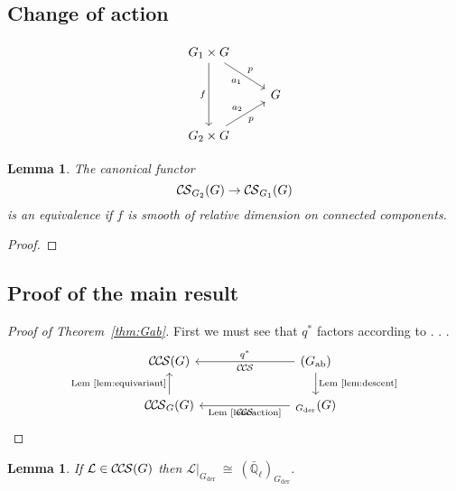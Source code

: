 \documentclass[10pt]{amsart}
\theoremstyle{plain}
\newtheorem{lemma}[theorem]{Lemma}
\theoremstyle{definition}
\newcommand{\EE}{\mathbb{\bar Q}_\ell}
\newcommand{\der}{_{\operatorname{der}}}
\newcommand{\ab}{_{\operatorname{ab}}}
\newcommand{\iso}{{\ \cong\ }}
\newcommand{\cs}[1]{{\mathcal{#1}}}
\newcommand{\CS}{{\mathcal{C\hskip-0.8pt S}}}
\newcommand{\CCS}{{\mathcal{C\hskip-.8pt C\hskip-0.8pt S}}}
\begin{document}
\subsection{Change of action}

\[
\begin{tikzcd}
\arrow{dd}[swap]{f} G_1 \times G \arrow{dr}[swap]{a_1}{p} & \\
& G \\
G_2 \times G \arrow{ur}{a_2}[swap]{p} & 
\end{tikzcd}
\]

\begin{lemma}\label{lem:action}
The canonical functor
\[
\CS_{G_2}(G) \to \CS_{G_1}(G)
\]
is an equivalence if $f$ is smooth of relative dimension on connected components.
\end{lemma}
\begin{proof}
\end{proof}

\subsection{Proof of the main result}

\begin{proof}[Proof of Theorem~\ref{thm:Gab}]
First we must see that $q^*$ factors according to . . . 
\[
\begin{tikzcd}
 \CCS(G)  &&& \arrow{lll}[swap]{q^*}  \CCS(G\ab) \arrow{d}{\text{Lem~\ref{lem:descent}}} \\
\CCS_G(G)  \arrow{u}{\text{Lem~\ref{lem:equivariant}}} &&& \arrow{lll}{\text{Lem~\ref{lem:action}}} \CCS_{G\der}(G) 
\end{tikzcd}
\]
\end{proof}

\begin{lemma}\label{lem:Lder}
If $\cs{L}\in \CCS(G)$ then $\cs{L}\vert_{G\der} \iso (\EE)_{G\der}$.
\end{lemma}
\end{document}
